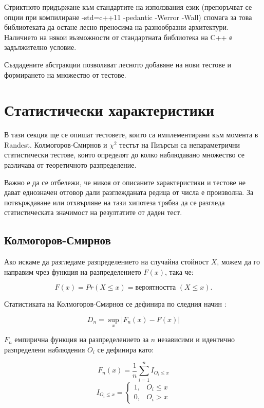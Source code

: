 \documentclass[12pt,a4paper]{article}
\theoremstyle{plain}
\begin{document}
    Стриктното придържане към стандартите на използвания език (препоръчват се опции при компилиране -std=c++11 -pedantic -Werror -Wall) спомага за това библиотеката да остане лесно преносима на разнообразни архитектури. Наличието на някои възможности от стандартната библиотека на C++ е задължително условие.

    Създадените абстракции позволяват лесното добавяне на нови тестове и формирането на множество от тестове.

\section{Статистически характеристики}

    В тази секция ще се опишат тестовете, които са имплементирани към момента в Randest. Колмогоров-Смирнов и $\chi^2$ тестът на Пиърсън са непараметрични статистически тестове, които определят до колко наблюдавано множество се различава от теоретичното разпределение.

    Важно е да се отбележи, че никоя от описаните характеристики и тестове не дават еднозначен отговор дали разглежданата редица от числа е произволна. За потвърждаване или отхвърляне на тази хипотеза трябва да се разгледа статистическата значимост на резултатите от даден тест.
    \subsection{Колмогоров-Смирнов}
    \label{kstest}

        Ако искаме да разгледаме разпределението на случайна стойност $X$, можем да го направим чрез функция на разпределението $F(x)$, така че:
        
        \[
            F(x) = Pr(X \le x) = \text{вероятността $(X \le x)$.}
        \]

        Статистиката на Колмогоров-Смирнов се дефинира по следния начин \cite{kstest}:

        \[
            D_n = \sup_x|F_n(x) - F(x)|
        \]

        $F_n$ емпирична функция на разпределението за $n$ независими и идентично разпределени наблюдения $O_i$ се дефинира като:

        \[
            F_n(x) = \frac{1}{n}\sum_{i=1}^{n}I_{O_i \le x}
        \]
        \[
            I_{O_i \le x} = \begin{cases}
             1, & O_i \le x\\
             0, & O_i > x
            \end{cases}
        \]
\end{document}
